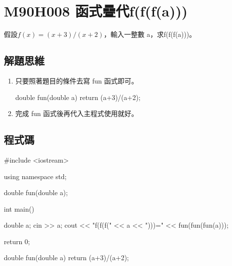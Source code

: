 \section{M90H008 函式疊代f(f(f(a)))}
假設$f(x)=(x+3)/(x+2)$，輸入一整數 a，求f(f(f(a)))。
\subsection{解題思維}

\begin{enumerate}
	\item
	只要照著題目的條件去寫 fun 函式即可。
	\begin{inside}
	double fun(double a) {
		return (a+3)/(a+2);
	}
	\end{inside}
	\item
	完成 fun 函式後再代入主程式使用就好。
\end{enumerate} 

\subsection{程式碼}
\begin{cppcode}
	#include <iostream>

	using namespace std;
	
	double fun(double a);
	
	int main()
	{
		double a;
		cin >> a;
		cout << "f(f(f(" << a << ")))=" << fun(fun(fun(a)));
		
		return 0;
	}
	
	double fun(double a) {
		return (a+3)/(a+2);
	}
\end{cppcode}
